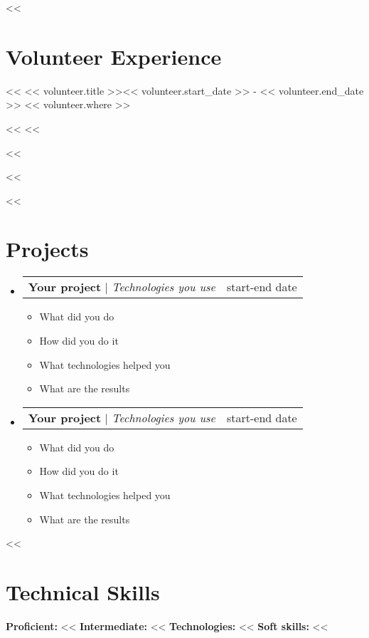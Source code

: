 \documentclass[letterpaper,11pt]{article}
\makeatletter
\newcommand{\resumeItem}[1]{
  \item\small{
    {#1 \vspace{-2pt}}
  }
}
\newcommand{\resumeSubheading}[4]{
  \vspace{-2pt}\item
    \begin{tabular*}{0.97\textwidth}[t]{l@{\extracolsep{\fill}}r}
      \textbf{#1} & #2 \\
      \textit{\small#3} & \textit{\small #4} \\
    \end{tabular*}\vspace{-7pt}
}
\newcommand{\resumeProjectHeading}[2]{
    \item
    \begin{tabular*}{0.97\textwidth}{l@{\extracolsep{\fill}}r}
      \small#1 & #2 \\
    \end{tabular*}\vspace{-7pt}
}
\newcommand{\resumeSubHeadingListStart}{\begin{itemize}[leftmargin=0.15in, label={}]}
\newcommand{\resumeSubHeadingListEnd}{\end{itemize}}
\newcommand{\resumeItemListStart}{\begin{itemize}}
\newcommand{\resumeItemListEnd}{\end{itemize}\vspace{-5pt}}
\makeatother
\begin{document}
<<%
\section{Volunteer Experience}
  \resumeSubHeadingListStart

    <<%
      {<< volunteer.title >>}{<< volunteer.start_date >> - << volunteer.end_date >>}
      {<< volunteer.where >>}{}
      \resumeItemListStart
        <<%
        <<%
      \resumeItemListEnd
    <<%
  \resumeSubHeadingListEnd
<<%


<<%
\section{Projects}
    \resumeSubHeadingListStart
      \resumeProjectHeading
          {\textbf{Your project} $|$ \emph{Technologies you use}}{start-end date}
          \resumeItemListStart
            \resumeItem{What did you do}
            \resumeItem{How did you do it}
            \resumeItem{What technologies helped you}
            \resumeItem{What are the results}
          \resumeItemListEnd
      \resumeProjectHeading
          {\textbf{Your project} $|$ \emph{Technologies you use}}{start-end date}
          \resumeItemListStart
            \resumeItem{What did you do}
            \resumeItem{How did you do it}
            \resumeItem{What technologies helped you}
            \resumeItem{What are the results}
          \resumeItemListEnd
    \resumeSubHeadingListEnd
<<%


\section{Technical Skills}
 \begin{itemize}[leftmargin=0.15in, label={}]
    \small{\item{
     \textbf{Proficient: }<<%
     \textbf{Intermediate: }<<%
     \textbf{Technologies: }<<%
     \textbf{Soft skills: }<<%
    }}
 \end{itemize}


\end{document}

